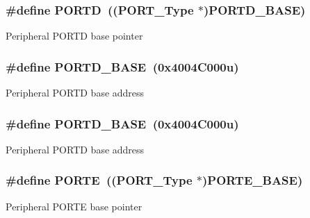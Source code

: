 \subsubsection[{\texorpdfstring{P\+O\+R\+TD}{PORTD}}]{\setlength{\rightskip}{0pt plus 5cm}\#define P\+O\+R\+TD~(({\bf P\+O\+R\+T\+\_\+\+Type} $\ast$){\bf P\+O\+R\+T\+D\+\_\+\+B\+A\+SE})}\hypertarget{group__PORT__Peripheral__Access__Layer_ga3e6a2517db4f9cb7c9037adf0aefe79b}{}\label{group__PORT__Peripheral__Access__Layer_ga3e6a2517db4f9cb7c9037adf0aefe79b}
Peripheral P\+O\+R\+TD base pointer 
\subsubsection[{\texorpdfstring{P\+O\+R\+T\+D\+\_\+\+B\+A\+SE}{PORTD_BASE}}]{\setlength{\rightskip}{0pt plus 5cm}\#define P\+O\+R\+T\+D\+\_\+\+B\+A\+SE~(0x4004\+C000u)}\hypertarget{group__PORT__Peripheral__Access__Layer_gab88c980d0129f396683260eb978daf15}{}\label{group__PORT__Peripheral__Access__Layer_gab88c980d0129f396683260eb978daf15}
Peripheral P\+O\+R\+TD base address 
\subsubsection[{\texorpdfstring{P\+O\+R\+T\+D\+\_\+\+B\+A\+SE}{PORTD_BASE}}]{\setlength{\rightskip}{0pt plus 5cm}\#define P\+O\+R\+T\+D\+\_\+\+B\+A\+SE~(0x4004\+C000u)}\hypertarget{group__PORT__Peripheral__Access__Layer_gab88c980d0129f396683260eb978daf15}{}\label{group__PORT__Peripheral__Access__Layer_gab88c980d0129f396683260eb978daf15}
Peripheral P\+O\+R\+TD base address 
\subsubsection[{\texorpdfstring{P\+O\+R\+TE}{PORTE}}]{\setlength{\rightskip}{0pt plus 5cm}\#define P\+O\+R\+TE~(({\bf P\+O\+R\+T\+\_\+\+Type} $\ast$){\bf P\+O\+R\+T\+E\+\_\+\+B\+A\+SE})}\hypertarget{group__PORT__Peripheral__Access__Layer_ga7e2386d3b1084b5b875ae3696f550ba9}{}\label{group__PORT__Peripheral__Access__Layer_ga7e2386d3b1084b5b875ae3696f550ba9}
Peripheral P\+O\+R\+TE base pointer 
